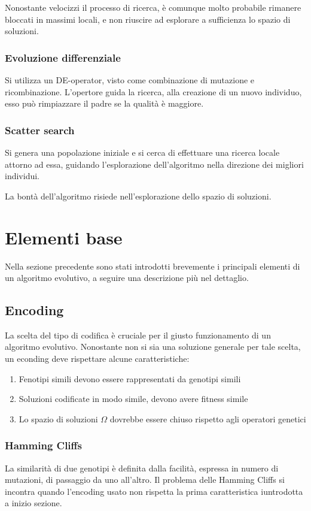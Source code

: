 \documentclass[a4paper]{article}
\begin{document}
Nonostante velocizzi il processo di ricerca, è comunque molto probabile rimanere bloccati 
in massimi locali, e non riuscire ad esplorare a sufficienza lo spazio di soluzioni.

\subsubsection{Evoluzione differenziale}
Si utilizza un DE-operator, visto come combinazione di mutazione e ricombinazione.
L'opertore guida la ricerca, alla creazione di un nuovo individuo, esso può rimpiazzare
il padre se la qualità è maggiore.

\subsubsection{Scatter search}
Si genera una popolazione iniziale e si cerca di effettuare una ricerca locale attorno ad 
essa, guidando l'esplorazione dell'algoritmo nella direzione dei migliori individui.

La bontà dell'algoritmo risiede nell'esplorazione dello spazio di soluzioni.

\newpage

\section{Elementi base}
Nella sezione precedente sono stati introdotti brevemente i principali elementi 
di un algoritmo evolutivo, a seguire una descrizione più nel dettaglio.

\subsection{Encoding}
La scelta del tipo di codifica è cruciale per il giusto funzionamento
di un algoritmo evolutivo.
Nonostante non si sia una soluzione generale per tale scelta, un econding deve rispettare 
alcune caratteristiche:
\begin{enumerate}
    \item Fenotipi simili devono essere rappresentati da genotipi simili
    \item Soluzioni codificate in modo simile, devono avere fitness simile
    \item Lo spazio di soluzioni $\Omega$ dovrebbe essere chiuso rispetto agli operatori genetici
\end{enumerate}
\subsubsection{Hamming Cliffs}
La similarità di due genotipi è definita dalla facilità, espressa in numero 
di mutazioni, di passaggio da uno all'altro. 
Il problema delle Hamming Cliffs si incontra quando l'encoding usato non rispetta 
la prima caratteristica iuntrodotta a inizio sezione.
\end{document}
